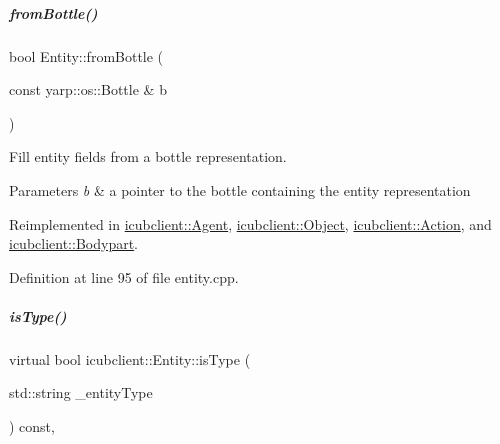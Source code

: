 \mbox{\label{group__icubclient__representations_aba7fbff7372e12c9eacf7f458ba66478}} 
\subparagraph{\texorpdfstring{from\+Bottle()}{fromBottle()}}
{\footnotesize\ttfamily bool Entity\+::from\+Bottle (\begin{DoxyParamCaption}\item[{const yarp\+::os\+::\+Bottle \&}]{b }\end{DoxyParamCaption})\hspace{0.3cm}{\ttfamily [virtual]}}



Fill entity fields from a bottle representation. 


\begin{DoxyParams}{Parameters}
{\em b} & a pointer to the bottle containing the entity representation \\
\hline
\end{DoxyParams}


Reimplemented in \hyperlink{group__icubclient__representations_abee6123159a9c2d01cd0f6609c8e3415}{icubclient\+::\+Agent}, \hyperlink{group__icubclient__representations_ab5662af99b6bfa7d3996192c62536bf1}{icubclient\+::\+Object}, \hyperlink{group__icubclient__representations_a5bde40cd7f11badb7d61b70e51fe18c0}{icubclient\+::\+Action}, and \hyperlink{group__icubclient__representations_a0d70a33efc69486a46e7f6a06abc5ff2}{icubclient\+::\+Bodypart}.



Definition at line 95 of file entity.\+cpp.

\mbox{\label{group__icubclient__representations_a5cbd0e5e254b3881a6a0adfc28107eb5}} 
\subparagraph{\texorpdfstring{is\+Type()}{isType()}}
{\footnotesize\ttfamily virtual bool icubclient\+::\+Entity\+::is\+Type (\begin{DoxyParamCaption}\item[{std\+::string}]{\+\_\+entity\+Type }\end{DoxyParamCaption}) const\hspace{0.3cm}{\ttfamily [inline]}, {\ttfamily [virtual]}}



